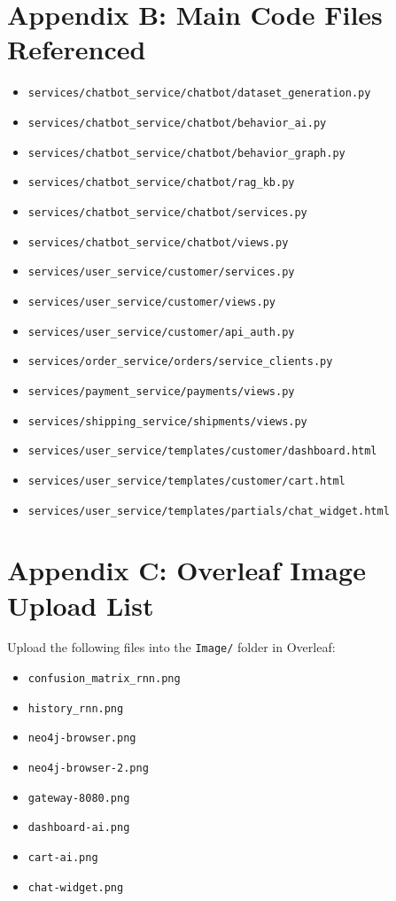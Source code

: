 \documentclass[12pt,a4paper]{article}
\begin{document}
\section{Appendix B: Main Code Files Referenced}

\begin{itemize}
  \item \texttt{services/chatbot\_service/chatbot/dataset\_generation.py}
  \item \texttt{services/chatbot\_service/chatbot/behavior\_ai.py}
  \item \texttt{services/chatbot\_service/chatbot/behavior\_graph.py}
  \item \texttt{services/chatbot\_service/chatbot/rag\_kb.py}
  \item \texttt{services/chatbot\_service/chatbot/services.py}
  \item \texttt{services/chatbot\_service/chatbot/views.py}
  \item \texttt{services/user\_service/customer/services.py}
  \item \texttt{services/user\_service/customer/views.py}
  \item \texttt{services/user\_service/customer/api\_auth.py}
  \item \texttt{services/order\_service/orders/service\_clients.py}
  \item \texttt{services/payment\_service/payments/views.py}
  \item \texttt{services/shipping\_service/shipments/views.py}
  \item \texttt{services/user\_service/templates/customer/dashboard.html}
  \item \texttt{services/user\_service/templates/customer/cart.html}
  \item \texttt{services/user\_service/templates/partials/chat\_widget.html}
\end{itemize}

\section{Appendix C: Overleaf Image Upload List}
Upload the following files into the \texttt{Image/} folder in Overleaf:
\begin{itemize}
  \item \texttt{confusion\_matrix\_rnn.png}
  \item \texttt{history\_rnn.png}
  \item \texttt{neo4j-browser.png}
  \item \texttt{neo4j-browser-2.png}
  \item \texttt{gateway-8080.png}
  \item \texttt{dashboard-ai.png}
  \item \texttt{cart-ai.png}
  \item \texttt{chat-widget.png}
\end{itemize}
\end{document}
